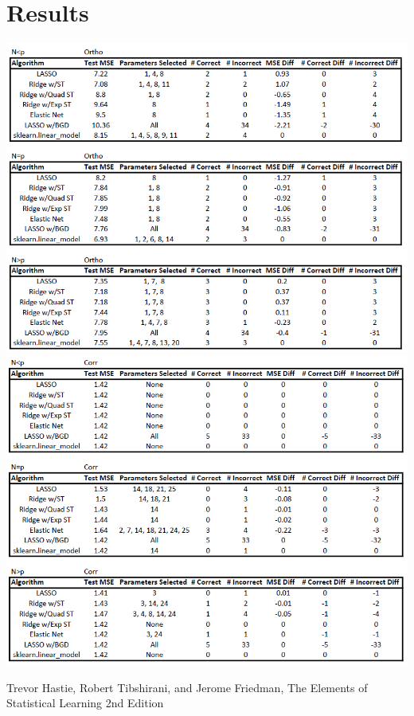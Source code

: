 \documentclass[11pt]{article}
\begin{document}
\section{Results}
\includegraphics[scale=0.6]{ortho.PNG} \\
\includegraphics[scale=0.6]{corr.PNG}

\begin{thebibliography}{9}
Trevor Hastie, Robert Tibshirani, and Jerome Friedman,
The Elements of Statistical Learning 2nd Edition
\end{thebibliography}
\end{document}
